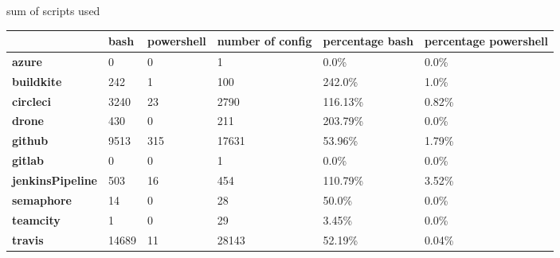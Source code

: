

\caption{sum of scripts used}
\label{table:scripts used}
\begin{tabular}{|l|l|l|l|l|l|}
\hline
{} &   bash &  powershell &  number of config & percentage bash & percentage powershell \\ \hline

\textbf{azure          } &      0 &           0 &                 1 &            0.0\% &                  0.0\% \\ \hline
\textbf{buildkite      } &    242 &           1 &               100 &          242.0\% &                  1.0\% \\ \hline
\textbf{circleci       } &   3240 &          23 &              2790 &         116.13\% &                 0.82\% \\ \hline
\textbf{drone          } &    430 &           0 &               211 &         203.79\% &                  0.0\% \\ \hline
\textbf{github         } &   9513 &         315 &             17631 &          53.96\% &                 1.79\% \\ \hline
\textbf{gitlab         } &      0 &           0 &                 1 &            0.0\% &                  0.0\% \\ \hline
\textbf{jenkinsPipeline} &    503 &          16 &               454 &         110.79\% &                 3.52\% \\ \hline
\textbf{semaphore      } &     14 &           0 &                28 &           50.0\% &                  0.0\% \\ \hline
\textbf{teamcity       } &      1 &           0 &                29 &           3.45\% &                  0.0\% \\ \hline
\textbf{travis         } &  14689 &          11 &             28143 &          52.19\% &                 0.04\% \\ \hline

\end{tabular}

